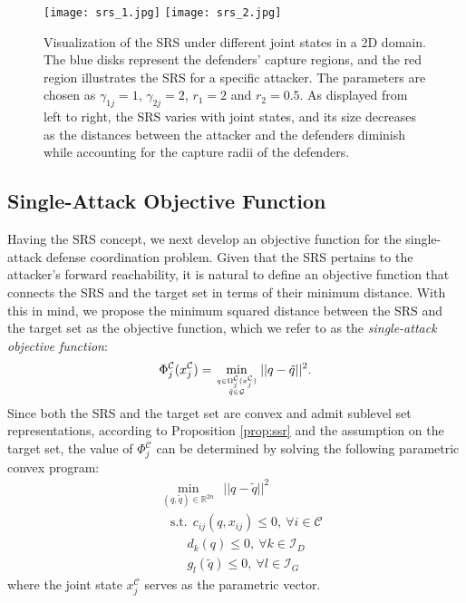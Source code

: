 \documentclass[journal]{IEEEtran}
\newcommand{\R}{\mathbb{R}}
\newcommand{\G}{\mathcal{G}}
\newcommand{\I}{\mathcal{I}}
\newcommand{\C}{\mathcal{C}}
\newcommand{\1}{\mathbf{1}}
\begin{document}
\begin{figure}[tp!] 
	\centering
	\texttt{[image: srs\_1.jpg]}
	\texttt{[image: srs\_2.jpg]}
	\caption{\footnotesize {Visualization of the SRS under different joint states in a 2D domain. The blue disks represent the defenders' capture regions, and the red region illustrates the SRS for a specific attacker. The parameters are chosen as $\gamma_{1j}=1$, $\gamma_{2j}=2$, $r_1=2$ and $r_2=0.5$. As displayed from left to right, the SRS varies with joint states, and its size decreases as the distances between the attacker and the defenders diminish while accounting for the capture radii of the defenders.}
	\label{fig:srs}}
\end{figure}

\subsection{Single-Attack Objective Function}

Having the SRS concept, we next develop an objective function for the single-attack defense coordination problem. Given that the SRS pertains to the attacker's forward reachability, it is natural to define an objective function that connects the SRS and the target set in terms of their minimum distance. With this in mind, we propose the minimum squared distance between the SRS and the target set as the objective function, which we refer to as the \textit{single-attack objective function}:
\begin{equation}\label{fun:saof}
	\Phi^{\C}_j(x^\C_j)=\min_{\genfrac{}{}{0pt}{2}{q\in \Omega^{\C}_j(x^{\C}_j)}{\tilde{q}\in \G}}||q-\tilde{q}||^2.
\end{equation}
Since both the SRS and the target set are convex and admit sublevel set representations, according to Proposition \ref{prop:ssr} and the assumption on the target set, the value of $\Phi^\C_j$ can be determined by solving the following parametric convex program:
\begin{equation}\label{co:d}
	\begin{split}
        &\min_{(q,\tilde{q})\in \R^{2n}}~~||q-\tilde{q}||^2\\
		&~~~~\mathrm{s.t.}~~c_{ij}(q,x_{ij})\leq 0,~\forall i\in \C\\
		&~~~~~~~~~~d_k(q)\leq 0,~\forall k\in \I_D\\
		&~~~~~~~~~~g_l(\tilde{q})\leq 0,~\forall l\in \I_G
	\end{split}
\end{equation}
where the joint state $x^\C_j$ serves as the parametric vector.
\end{document}
